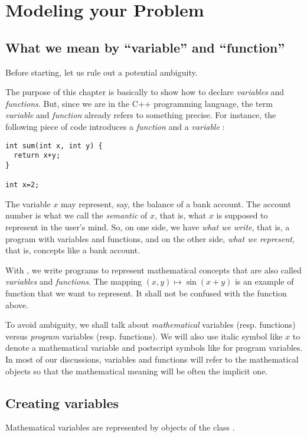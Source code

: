 \chapter{Modeling your Problem}\label{chap:mod}

\section{What we mean by ``variable'' and ``function''}

Before starting, let us rule out a potential ambiguity.

The purpose of this chapter is basically to show how to declare {\it variables} and {\it functions}.
But, since we are in the C++ programming language, the term {\it variable} and
{\it function} already refers to something precise. For instance, the following
piece of code introduces a {\it function}  and a {\it variable} :
\begin{lstlisting}
int sum(int x, int y) { 
  return x+y;
}

int x=2;
\end{lstlisting}
The variable $x$ may represent, say, the balance of a bank account.
The account number is what we call the {\it semantic} of $x$, that is, what $x$ is supposed
to represent in the user's mind. So, on one side,
we have {\it what we write}, that is, a program with variables and functions,
 and on the other side, {\it what we represent}, that is, concepts 
like a bank account.

With \ibex, we write programs to represent mathematical concepts
that are also called {\it variables} and {\it functions}.
The mapping $(x,y)\mapsto \sin(x+y)$ is an example of function that
we want to represent. It shall not be confused with the function 
above.

To avoid ambiguity, we shall talk about {\it mathematical}
variables (resp. functions) versus {\it program} variables (resp. functions).
We will also use italic symbol like $x$ to denote a mathematical variable
and postscript symbols like  for program variables.
In most of our discussions, variables and functions will refer
to the mathematical objects so that the mathematical meaning will be often the implicit one. 

\section{Creating variables}

Mathematical variables are represented by objects of the class .

